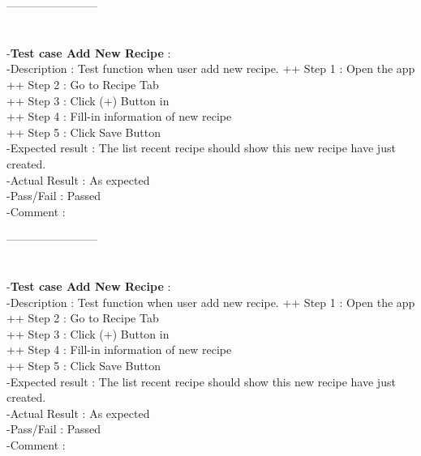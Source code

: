 \documentclass{article}
\begin{document}
        ------------------------\\ \\ \\
        -\textbf{Test case Add New Recipe }: \\
        -Description : Test function when user add new recipe.
        ++ Step 1 : Open the app  \\
        ++ Step 2 : Go to Recipe Tab \\
        ++ Step 3 : Click (+) Button in  \\
        ++ Step 4 : Fill-in information of new recipe \\
        ++ Step 5 : Click Save Button \\
        -Expected result : The list recent recipe should show this new recipe have just created. \\
        -Actual Result : As expected \\
        -Pass/Fail : Passed \\
        -Comment : 

        ------------------------\\ \\ \\
        -\textbf{Test case Add New Recipe }: \\
        -Description : Test function when user add new recipe.
        ++ Step 1 : Open the app  \\
        ++ Step 2 : Go to Recipe Tab \\
        ++ Step 3 : Click (+) Button in  \\
        ++ Step 4 : Fill-in information of new recipe \\
        ++ Step 5 : Click Save Button \\
        -Expected result : The list recent recipe should show this new recipe have just created. \\
        -Actual Result : As expected \\
        -Pass/Fail : Passed \\
        -Comment : 
\end{document}

